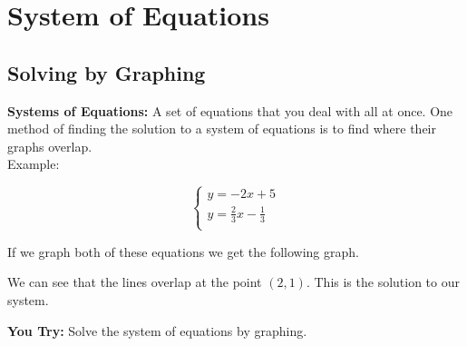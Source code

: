 \documentclass[11pt]{article}
\begin{document}
\let\stdsection\section
\renewcommand\section{\newpage\stdsection}

\section*{System of Equations}

\subsection*{Solving by Graphing}

\textbf{Systems of Equations:} A set of equations that you deal with all at once.
One method of finding the solution to a system of equations is to find where their graphs overlap.\\

Example: 

\begin{equation*}
  \begin{cases}
	y=-2x+5\\
	
	y=\frac{2}{3}x-\frac{1}{3}\\
  \end{cases}
\end{equation*}
	
If we graph both of these equations we get the following graph.\\

\begin{center}
\end{center}

We can see that the lines overlap at the point $(2,1)$. This is the solution to our system.

\hrulefill

\textbf{You Try:} Solve the system of equations by graphing.\\
\end{document}
